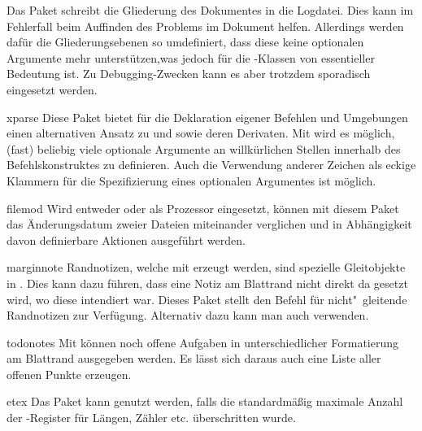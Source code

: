 \documentclass[%
  english,ngerman,%
  headings=optiontoheadandtoc,captions=tableheading,numbers=noenddot,%
  chapterpage,cdfoot,%
]{tudscrman}
\begin{document}
\begin{packages}
  Das Paket schreibt die Gliederung des Dokumentes in die Logdatei. Dies kann
  im Fehlerfall beim Auffinden des Problems im Dokument helfen. Allerdings 
  werden dafür die Gliederungsebenen so umdefiniert, dass diese keine optionalen 
  Argumente mehr unterstützen,was jedoch für die \TUDScript-Klassen von 
  essentieller Bedeutung ist. Zu Debugging-Zwecken kann es aber trotzdem 
  sporadisch eingesetzt werden.
\item[xparse]
  Diese Paket bietet für die Deklaration eigener Befehlen und Umgebungen einen 
  alternativen Ansatz zu  und  sowie 
  deren Derivaten. Mit  wird es möglich, (fast) beliebig viele 
  optionale Argumente an willkürlichen Stellen innerhalb des Befehlskonstruktes 
  zu definieren. Auch die Verwendung anderer Zeichen als eckige Klammern für die 
  Spezifizierung eines optionalen Argumentes ist möglich.
\item[filemod]
  Wird entweder  oder  als Prozessor 
  eingesetzt, können mit diesem Paket das Änderungsdatum zweier Dateien 
  miteinander verglichen und in Abhängigkeit davon definierbare Aktionen 
  ausgeführt werden. 
\item[marginnote]
  Randnotizen, welche mit  erzeugt werden, sind spezielle 
  Gleitobjekte in . Dies kann dazu führen, dass eine Notiz am 
  Blattrand nicht direkt da gesetzt wird, wo diese intendiert war. Dieses Paket 
  stellt den Befehl  für nicht"~gleitende Randnotizen zur 
  Verfügung. Alternativ dazu kann man auch  verwenden.
\item[todonotes]
  Mit  können noch offene Aufgaben in unterschiedlicher 
  Formatierung am Blattrand ausgegeben werden. Es lässt sich daraus auch eine  
  Liste aller offenen Punkte erzeugen.
\item[etex]
  Das Paket kann genutzt werden, falls die standardmäßig maximale Anzahl der 
  -Register für Längen, Zähler etc. überschritten wurde.
\end{packages}
\end{document}
